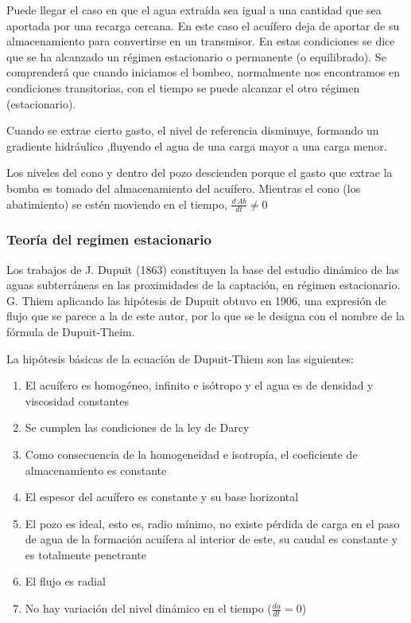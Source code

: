 Puede llegar el caso en que el agua extraída sea igual a una cantidad que sea aportada por una recarga cercana. En este caso el acuífero deja de aportar de su almacenamiento para convertirse en un transmisor. En estas condiciones se dice que se ha alcanzado un régimen estacionario o permanente (o equilibrado). Se comprenderá que cuando iniciamos el bombeo, normalmente nos encontramos en condiciones transitorias, con el tiempo se puede alcanzar el otro régimen (estacionario).

Cuando se extrae cierto gasto, el nivel de referencia disminuye, formando un gradiente hidráulico ,fluyendo el agua de una carga mayor a una carga menor.

Los niveles del cono y dentro del pozo descienden porque el gasto que extrae la bomba es tomado del almacenamiento del acuífero. Mientras el cono (los abatimiento) se estén moviendo en el tiempo, $\frac{d\,Ab}{dt}\neq 0$
\subsubsection{Teoría del regimen estacionario}
Los trabajos de J. Dupuit (1863) constituyen la base del estudio dinámico de las aguas subterráneas en las proximidades de la captación, en régimen estacionario. G. Thiem aplicando las hipótesis de Dupuit obtuvo en 1906, una expresión de flujo que se parece a la de este autor, por lo que se le designa con el nombre de la fórmula de Dupuit-Theim.

La hipótesis básicas de la ecuación de Dupuit-Thiem son las siguientes:
\begin{enumerate}
    \item El acuífero es homogéneo, infinito e isótropo y el agua es de densidad y viscosidad constantes
    \item Se cumplen las condiciones de la ley de Darcy
    \item Como consecuencia de la homogeneidad e isotropía, el coeficiente de almacenamiento es constante
    \item El espesor del acuífero es constante y su base horizontal
    \item El pozo es ideal, esto es, radio mínimo, no existe pérdida de carga en el paso de agua de la formación acuífera al interior de este, su caudal es constante y es totalmente penetrante
    \item El flujo es radial
    \item No hay variación del nivel dinámico en el tiempo ($\frac{da}{dt}=0$)
\end{enumerate}
